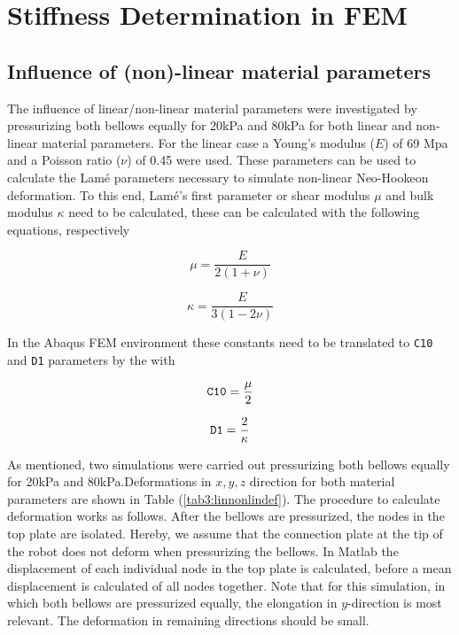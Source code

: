 




\section{Stiffness Determination in FEM}








\subsection{Influence of (non)-linear material parameters}


The influence of linear/non-linear material parameters were investigated by pressurizing both bellows equally for 20kPa and 80kPa for both linear and non-linear material parameters. For the linear case a Young's modulus ($E$) of 69 Mpa and a Poisson ratio ($\nu$) of 0.45 were used. These parameters can be used to calculate the Lamé parameters necessary to simulate non-linear Neo-Hookeon deformation. To this end, Lamé's first parameter or shear modulus $\mu$ and bulk modulus $\kappa$ need to be calculated, these can be calculated with the following equations, respectively

\begin{equation}
    \mu = \frac{E}{2(1+\nu)}
\end{equation}


\begin{equation}
    \kappa = \frac{E}{3(1-2\nu)}
\end{equation}

In the Abaqus FEM environment these constants need to be translated to \verb+C10+ and \verb+D1+ parameters by the with

\begin{equation}
    \verb+C10+ = \frac{\mu}{2}
\end{equation}


\begin{equation}
    \verb+D1+ = \frac{2}{\kappa}
\end{equation}

As mentioned, two simulations were carried out pressurizing both bellows equally for 20kPa and 80kPa.Deformations in $x,y,z$ direction for both material parameters are shown in Table (\ref{tab3:linnonlindef}). The procedure to calculate deformation works as follows. After the bellows are pressurized, the nodes in the top plate are isolated. Hereby, we assume that the connection plate at the tip of the robot does not deform when pressurizing the bellows. In Matlab the displacement of each individual node in the top plate is calculated, before a mean displacement is calculated of all nodes together. Note that for this simulation, in which both bellows are pressurized equally, the elongation in $y$-direction is most relevant. The deformation in remaining directions should be small.

